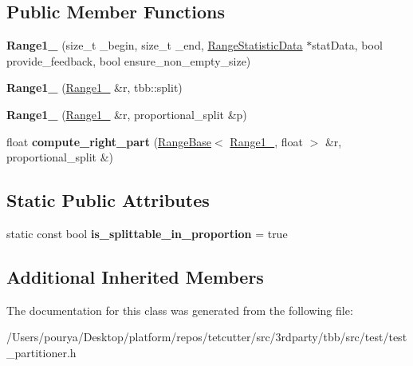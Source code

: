 \subsection*{Public Member Functions}
\begin{DoxyCompactItemize}
\item 
\hypertarget{classtest__partitioner__utils_1_1TestRanges_1_1Range1__2_abcf13344c2f8fd72de08a189baee146d}{}{\bfseries Range1\+\_} (size\+\_\+t \+\_\+begin, size\+\_\+t \+\_\+end, \hyperlink{structtest__partitioner__utils_1_1RangeStatisticData}{Range\+Statistic\+Data} $\ast$stat\+Data, bool provide\+\_\+feedback, bool ensure\+\_\+non\+\_\+empty\+\_\+size)\label{classtest__partitioner__utils_1_1TestRanges_1_1Range1__2_abcf13344c2f8fd72de08a189baee146d}

\item 
\hypertarget{classtest__partitioner__utils_1_1TestRanges_1_1Range1__2_a7bc180d7bb5d3ae2a844a618389eaa7d}{}{\bfseries Range1\+\_} (\hyperlink{classtest__partitioner__utils_1_1TestRanges_1_1Range1__2}{Range1\+\_} \&r, tbb\+::split)\label{classtest__partitioner__utils_1_1TestRanges_1_1Range1__2_a7bc180d7bb5d3ae2a844a618389eaa7d}

\item 
\hypertarget{classtest__partitioner__utils_1_1TestRanges_1_1Range1__2_aa6cd6a82a668cd556fe13ff562194df7}{}{\bfseries Range1\+\_} (\hyperlink{classtest__partitioner__utils_1_1TestRanges_1_1Range1__2}{Range1\+\_} \&r, proportional\+\_\+split \&p)\label{classtest__partitioner__utils_1_1TestRanges_1_1Range1__2_aa6cd6a82a668cd556fe13ff562194df7}

\item 
\hypertarget{classtest__partitioner__utils_1_1TestRanges_1_1Range1__2_abbe47a7e5fd0768253498b1275b2e379}{}float {\bfseries compute\+\_\+right\+\_\+part} (\hyperlink{classtest__partitioner__utils_1_1RangeBase}{Range\+Base}$<$ \hyperlink{classtest__partitioner__utils_1_1TestRanges_1_1Range1__2}{Range1\+\_}, float $>$ \&r, proportional\+\_\+split \&)\label{classtest__partitioner__utils_1_1TestRanges_1_1Range1__2_abbe47a7e5fd0768253498b1275b2e379}

\end{DoxyCompactItemize}
\subsection*{Static Public Attributes}
\begin{DoxyCompactItemize}
\item 
\hypertarget{classtest__partitioner__utils_1_1TestRanges_1_1Range1__2_a7c21ce8b59e85f25f5ec08fc22b5de37}{}static const bool {\bfseries is\+\_\+splittable\+\_\+in\+\_\+proportion} = true\label{classtest__partitioner__utils_1_1TestRanges_1_1Range1__2_a7c21ce8b59e85f25f5ec08fc22b5de37}

\end{DoxyCompactItemize}
\subsection*{Additional Inherited Members}


The documentation for this class was generated from the following file\+:\begin{DoxyCompactItemize}
\item 
/\+Users/pourya/\+Desktop/platform/repos/tetcutter/src/3rdparty/tbb/src/test/test\+\_\+partitioner.\+h\end{DoxyCompactItemize}
